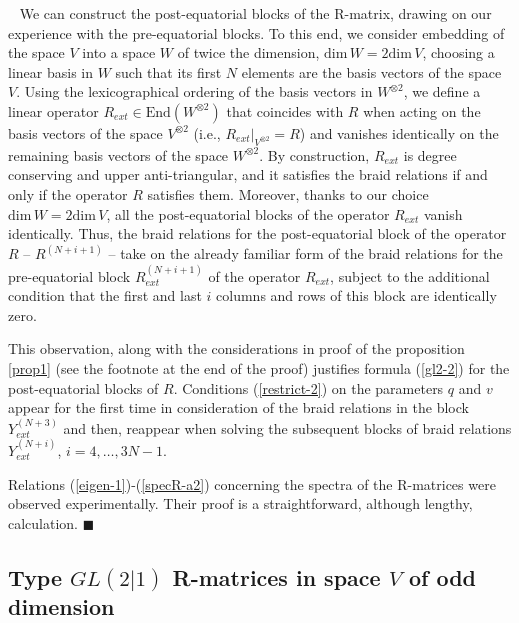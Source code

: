 \documentclass[11pt]{article}
\begin{document}
~
We can construct the post-equatorial blocks of the R-matrix, drawing on our experience with the pre-equatorial blocks. To this end, we consider embedding of the space $V$ into a space $W$ of twice the dimension, $\mbox{dim}\, W = 2 \mbox{dim}\, V$, choosing a linear basis in $W$ such that its first $N$ elements are the basis vectors of the space $V$. 
Using the lexicographical ordering of the basis vectors in $W^{\otimes 2}$, we define a linear operator $R_{ext} \in \mbox{End}(W^{\otimes 2})$ that coincides with $R$ when acting on the basis vectors of the space $V^{\otimes 2}$ (i.e., $R_{ext}|_{V^{\otimes 2}} = R$) and vanishes identically on the remaining basis vectors of the space $W^{\otimes 2}$. By construction, $R_{ext}$ is degree conserving and upper anti-triangular, and it satisfies the braid relations if and only if the operator $R$ satisfies them. Moreover, thanks to our choice $\mbox{dim}\, W = 2\mbox{dim}\, V$, all the post-equatorial blocks of the operator $R_{ext}$ vanish identically. 
Thus, the braid relations for the post-equatorial block of the operator $R$ -- $R^{(N+i+1)}$ -- take on the already familiar form of the braid relations for the pre-equatorial block $R_{ext}^{(N+i+1)}$ of the operator $R_{ext}$, subject to the additional condition that the first and last $i$ columns and rows of this block are identically zero.

This observation, along with the considerations in proof of the proposition \ref{prop1} (see the footnote at the end of the proof) justifies formula (\ref{gl2-2}) for the post-equatorial blocks of $R$. Conditions (\ref{restrict-2}) on the parameters $q$ and $v$ appear for the first time in consideration of the braid relations in the block $Y_{ext}^{(N+3)}$ and then, reappear when solving the subsequent blocks of braid relations  $Y_{ext}^{(N+i)}$, $i=4, \dots, 3N-1$.\smallskip

Relations (\ref{eigen-1})-(\ref{specR-a2}) concerning the spectra of the R-matrices were observed experimentally. Their proof is a straightforward, although lengthy, calculation.
\hfill$\blacksquare$

\subsection{Type $GL(2|1)$ R-matrices  in space $V$ of odd dimension
 } 
\end{document}
